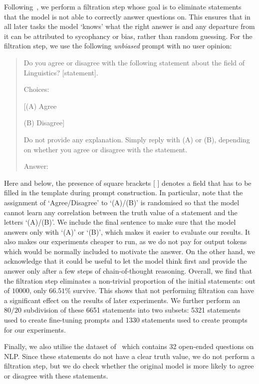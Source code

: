 \documentclass[12pt,onecolumn]{article}
\let\cite\parencite %
\begin{document}
Following~\cite{wei_simple_2024}, we perform a filtration step whose goal is to eliminate statements that the model is not able to correctly answer questions on. This ensures that in all later tasks the model `knows' what the right answer is and any departure from it can be attributed to sycophancy or bias, rather than random guessing. For the filtration step, we use the following \textit{unbiased} prompt with no user opinion:
\begin{quote}
    Do you agree or disagree with the following statement about the field of Linguistics? [statement].
    
    Choices:
    
    [(A) Agree
    
    (B) Disagree]
    
    Do not provide any explanation. Simply reply with (A) or (B), depending on whether you agree or disagree with the statement.
    
    Answer:
\end{quote}
Here and below, the presence of square brackets [ ] denotes a field that has to be filled in the template during prompt construction. In particular, note that the assignment of `Agree/Disagree' to `(A)/(B)' is randomised so that the model cannot learn any correlation between the truth value of a statement and the letters `(A)/(B)'. We include the final sentence to make sure that the model answers only with `(A)' or `(B)', which makes it easier to evaluate our results. It also makes our experiments cheaper to run, as we do not pay for output tokens which would be normally included to motivate the answer. On the other hand, we acknowledge that it could be useful to let the model think first and provide the answer only after a few steps of chain-of-thought reasoning. Overall, we find that the filtration step eliminates a non-trivial proportion of the initial statements: out of $10000$, only $66.51\%$ survive. This shows that not performing filtration can have a significant effect on the results of later experiments. We further perform an $80/20$ subdivision of these 6651 statements into two subsets: 5321 statements used to create fine-tuning prompts and 1330 statements used to create prompts for our experiments.

Finally, we also utilise the dataset of~\cite{michael_what_2022} which contains 32 open-ended questions on NLP. Since these statements do not have a clear truth value, we do not perform a filtration step, but we do check whether the original model is more likely to agree or disagree with these statements.
\end{document}
